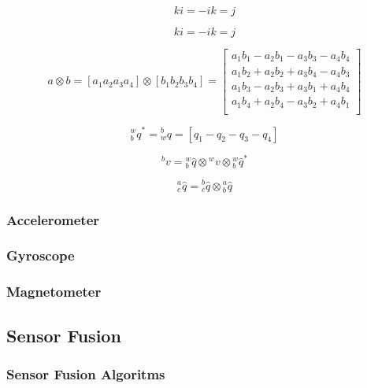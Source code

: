 \begin{equation}
    ki = -ik = j
\end{equation}

\begin{equation}
    ki = -ik = j
\end{equation}

\begin{equation}
    a \otimes b = \left[a_1 a_2 a_3 a_4\right] \otimes \left[b_1 b_2 b_3 b_4\right]     =
    \begin{bmatrix}
        a_1 b_1 - a_2 b_1 - a_3 b_3 - a_4 b_4 \\
        a_1 b_2 + a_2 b_2 + a_3 b_4 - a_4 b_3 \\
        a_1 b_3 - a_2 b_3 + a_3 b_1 + a_4 b_4 \\
        a_1 b_4 + a_2 b_4 - a_3 b_2 + a_4 b_1 \\
    \end{bmatrix}
\end{equation}

\begin{equation}
    \textrm{$_{b}^{w}q$}^* =\textrm{$_{w}^{b}q$} = \left[q_1 - q_2 - q_3 - q_4\right]
\end{equation}

\begin{equation}
    \textrm{$^{b}v$} = \textrm{$_{b}^{w}\hat{q}$} \otimes \textrm{$^{w}v$} \otimes \textrm{$_{b}^{w}\hat{q}$}^*
\end{equation}

\begin{equation}
    \textrm{$_{c}^{a}\hat{q}$} = \textrm{$_{c}^{b}\hat{q}$} \otimes \textrm{$_{b}^{a}\hat{q}$}
\end{equation}

\subsubsection{Accelerometer}
\subsubsection{Gyroscope}
\subsubsection{Magnetometer}
\subsection{Sensor Fusion}
\subsubsection{Sensor Fusion Algoritms}
